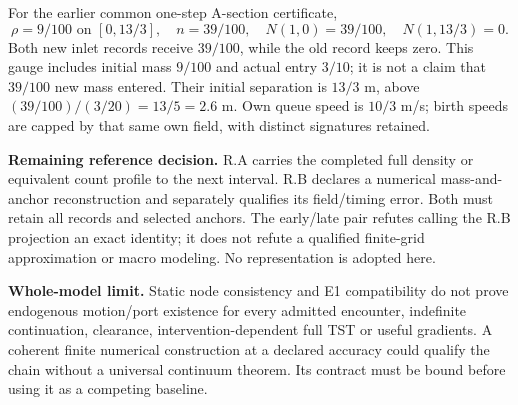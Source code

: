 \documentclass[11pt,a4paper]{article}
\begin{document}
For the earlier common one-step A-section certificate,
\[
 \rho=9/100\text{ on }[0,13/3],\quad n=39/100,
 \quad N(1,0)=39/100,\quad N(1,13/3)=0.
\]
Both new inlet records receive $39/100$, while the old record keeps zero.
This gauge includes initial mass $9/100$ and actual entry $3/10$; it is not
a claim that $39/100$ new mass entered. Their initial separation is $13/3$ m,
above $(39/100)/(3/20)=13/5=2.6$ m. Own queue speed is $10/3$ m/s;
birth speeds are capped by that same own field, with distinct signatures retained.

\textbf{Remaining reference decision.} R.A carries the completed full density
or equivalent count profile to the next interval. R.B declares a numerical
mass-and-anchor reconstruction and separately qualifies its field/timing error.
Both must retain all records and selected anchors. The early/late pair refutes
calling the R.B projection an exact identity; it does not refute a qualified
finite-grid approximation or macro modeling. No representation is adopted here.

\textbf{Whole-model limit.} Static node consistency and E1 compatibility do
not prove endogenous motion/port existence for every admitted encounter,
indefinite continuation, clearance, intervention-dependent full TST or useful
gradients. A coherent finite numerical construction at a declared accuracy
could qualify the chain without a universal continuum theorem. Its contract
must be bound before using it as a competing baseline.
\end{document}

